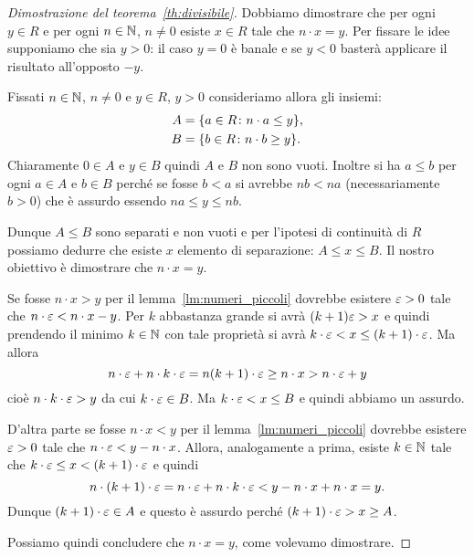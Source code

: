 %
\begin{proof}[Dimostrazione del teorema~\ref{th:divisibile}]
  Dobbiamo dimostrare che per ogni $y\in R$ e per ogni $n\in {\mathbb N}$, $n\neq 0$
  esiste $x\in R$ tale che $n\cdot x=y$.
  Per fissare le idee supponiamo che sia $y>0$: il caso $y=0$ è banale 
  e se $y<0$ basterà applicare il risultato all'opposto $-y$.
  
  Fissati $n\in {\mathbb N}$, $n\neq 0$ e $y\in R$, $y>0$ 
  consideriamo allora gli insiemi:
  \begin{align*}
    A &= {\left\{ a\in R\colon n\cdot a\le y \right\}},\\
    B &= {\left\{ b\in R\colon n\cdot b\ge y \right\}}.
  \end{align*}
  Chiaramente $0\in A$ e $y\in B$ quindi $A$ e $B$ non sono vuoti.
  Inoltre si ha $a\le b$ per ogni $a\in A$ e $b\in B$ 
  perché se fosse $b < a$ si avrebbe $nb < na$ 
  (necessariamente $b>0$) che 
  è assurdo essendo $na \le y \le nb$.
  
  Dunque $A\le B$ sono separati e non vuoti e per l'ipotesi di continuità di $R$ 
  possiamo dedurre che esiste $x$ elemento di separazione: $A\le x \le B$.
  Il nostro obiettivo è dimostrare che $n\cdot x=y$.

  Se fosse $n\cdot x > y$ per il lemma~\ref{lm:numeri_piccoli} dovrebbe 
  esistere $\varepsilon>0$ tale che $n\cdot \varepsilon < n\cdot x - y$.
  Per $k$ abbastanza grande si avrà $(k+1)\varepsilon > x$ e quindi prendendo 
  il minimo $k\in {\mathbb N}$ con tale proprietà si avrà
  $k\cdot \varepsilon < x \le (k+1)\cdot \varepsilon$.
  Ma allora 
  \[
    n\cdot \varepsilon + n\cdot k\cdot \varepsilon
    = n(k+1)\cdot \varepsilon 
    \ge n\cdot x 
    > n\cdot \varepsilon + y 
  \]
  cioè $n\cdot k\cdot \varepsilon > y$ da cui
  $k\cdot \varepsilon \in B$. 
  Ma $k\cdot\varepsilon < x \le B$ e quindi abbiamo un assurdo.

  D'altra parte se fosse $n\cdot x < y$ per il lemma~\ref{lm:numeri_piccoli}
  dovrebbe esistere $\varepsilon>0$ tale che $n\cdot \varepsilon < y-n\cdot x$.
  Allora, analogamente a prima, esiste $k\in{\mathbb N}$ tale che 
  $k\cdot \varepsilon \le x < (k+1)\cdot \varepsilon$ e quindi
  \[
    n\cdot (k+1) \cdot \varepsilon 
    = n\cdot \varepsilon + n \cdot k \cdot \varepsilon 
    < y - n\cdot x + n\cdot x 
    =y.  
  \]
  Dunque $(k+1)\cdot \varepsilon \in A$ e questo è assurdo perché 
  $(k+1)\cdot \varepsilon > x \ge A$.

  Possiamo quindi concludere che $n\cdot x = y$, come volevamo dimostrare.
\end{proof}

